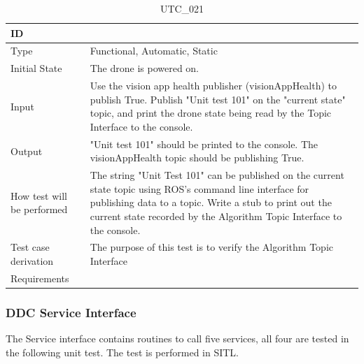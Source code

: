 \documentclass[12pt, titlepage]{article}
\begin{document}
\begin{table}[!h]
\begin{center}
\caption {UTC\_021}
\label{tab:UTC_021}
\begin{tabular}{ | m{3.2cm} | m{12.2cm} | } 
\hline
ID & \nameref{tab:UTC_021} \\ 
\hline
Type &  Functional, Automatic, Static  \\ 
\hline
Initial State & The drone is powered on. \\ 
\hline
Input & Use the vision app health publisher (visionAppHealth) to publish True. Publish "Unit test 101" on the "current state" topic, and print the drone state being read by the Topic Interface to the console. \\ 
\hline
Output &  "Unit test 101" should be printed to the console. The visionAppHealth topic should be publishing True. \\ 
\hline
How test will be performed & The string "Unit Test 101" can be published on the current state topic using ROS's command line interface for publishing data to a topic.
Write a stub to print out the current state recorded by the Algorithm Topic Interface to the console.  \\ 
\hline
Test case derivation & The purpose of this test is to verify the Algorithm Topic Interface \\ 
\hline
Requirements &  \\ 
\hline
\end{tabular}
\end{center}
\end{table}

\clearpage

\subsubsection{DDC Service Interface}

The Service interface contains routines to call five services, all four are tested in the following unit test. The test is performed in SITL.
\end{document}

